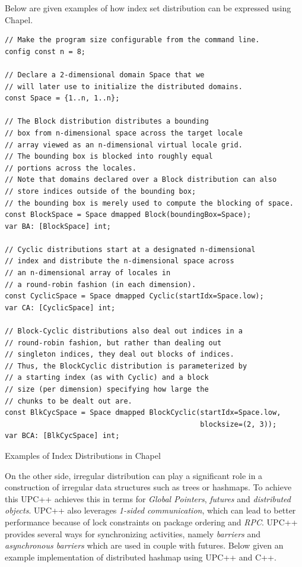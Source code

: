 \documentclass[14pt]{extreport}
\begin{document}
Below are given examples of how index set distribution can be expressed using Chapel.

\begin{listing}[H]
\begin{verbatim}
// Make the program size configurable from the command line.
config const n = 8;

// Declare a 2-dimensional domain Space that we 
// will later use to initialize the distributed domains.
const Space = {1..n, 1..n};

// The Block distribution distributes a bounding 
// box from n-dimensional space across the target locale 
// array viewed as an n-dimensional virtual locale grid. 
// The bounding box is blocked into roughly equal 
// portions across the locales. 
// Note that domains declared over a Block distribution can also 
// store indices outside of the bounding box;
// the bounding box is merely used to compute the blocking of space.
const BlockSpace = Space dmapped Block(boundingBox=Space);
var BA: [BlockSpace] int;

// Cyclic distributions start at a designated n-dimensional 
// index and distribute the n-dimensional space across 
// an n-dimensional array of locales in 
// a round-robin fashion (in each dimension).
const CyclicSpace = Space dmapped Cyclic(startIdx=Space.low);
var CA: [CyclicSpace] int;

// Block-Cyclic distributions also deal out indices in a 
// round-robin fashion, but rather than dealing out 
// singleton indices, they deal out blocks of indices. 
// Thus, the BlockCyclic distribution is parameterized by 
// a starting index (as with Cyclic) and a block 
// size (per dimension) specifying how large the 
// chunks to be dealt out are.
const BlkCycSpace = Space dmapped BlockCyclic(startIdx=Space.low,
                                              blocksize=(2, 3));
var BCA: [BlkCycSpace] int;
\end{verbatim}
\caption{Examples of Index Distributions in Chapel}
\label{ChapelExamples}
\end{listing}

On the other side, irregular distribution can play a significant role in a construction of irregular data structures such as trees or hashmaps. To achieve this UPC++\cite{upcpp} achieves this in terms for \textit{Global Pointers}, \textit{futures} and \textit{distributed objects}. UPC++ also leverages \textit{1-sided communication}, which can lead to better performance because of lock constraints on package ordering and \textit{RPC}. UPC++ provides several ways for synchronizing activities, namely \textit{barriers} and \textit{asynchronous barriers} which are used in couple with futures. Below given an example implementation of distributed hashmap using UPC++ and C++.
\end{document}
